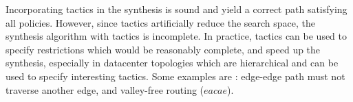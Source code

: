 Incorporating tactics in the synthesis is sound and yield a correct path satisfying all policies.
 However, since tactics artificially reduce the search space, the synthesis algorithm with tactics is incomplete. 
 In practice, tactics can be used to specify restrictions which would be reasonably complete, 
 and speed up the synthesis, especially in datacenter topologies which are hierarchical 
 and can be used to specify interesting tactics. Some examples are : edge-edge path must not
 traverse another edge, and valley-free routing ($eacae$).

